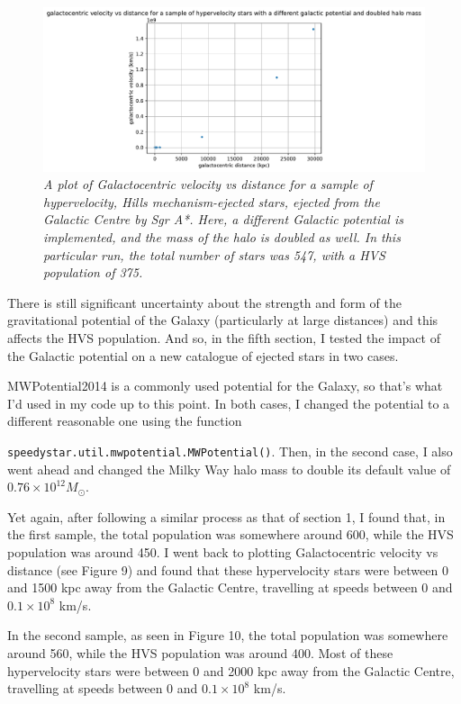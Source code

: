 \documentclass{article}
\begin{document}
\begin{figure}[h!]
\caption{\textit{A plot of Galactocentric velocity vs distance for a sample of hypervelocity, Hills mechanism-ejected stars, ejected from the Galactic Centre by Sgr A*. Here, a different Galactic potential is implemented, and the mass of the halo is doubled as well. In this particular run, the total number of stars was 547, with a HVS population of 375.}}
\includegraphics[width=1.1\textwidth]{GCv_vs_GCdist_hyp_5b.pdf}
\end{figure}

There is still significant uncertainty about the strength and form of the gravitational potential of the Galaxy (particularly at large distances) and this affects the HVS population. And so, in the fifth section, I tested the impact of the Galactic potential on a new catalogue of ejected stars in two cases. 

MWPotential2014 is a commonly used potential for the Galaxy, so that's what I'd used in my code up to this point. In both cases, I changed the potential to a different reasonable one using the function 

\noindent\texttt{speedystar.util.mwpotential.MWPotential()}. Then, in the second case, I also went ahead and changed the Milky Way halo mass to double its default value of $0.76 \times 10^{12} M_{\odot}$.

\vspace{1cm}

Yet again, after following a similar process as that of section 1, I found that, in the first sample, the total population was somewhere around 600, while the HVS population was around 450. I went back to plotting Galactocentric velocity vs distance (see Figure 9) and found that these hypervelocity stars were between 0 and 1500 kpc away from the Galactic Centre, travelling at speeds between 0 and $0.1 \times 10^8$ km/s. 

In the second sample, as seen in Figure 10, the total population was somewhere around 560, while the HVS population was around 400. Most of these hypervelocity stars were between 0 and 2000 kpc away from the Galactic Centre, travelling at speeds between 0 and $0.1 \times 10^8$ km/s. 
\end{document}
